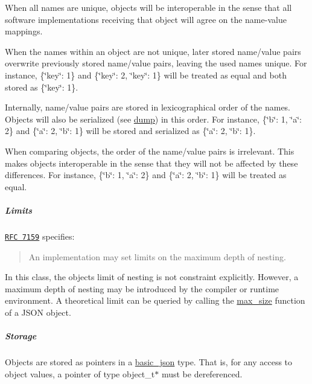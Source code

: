 \begin{DoxyItemize}
\item When all names are unique, objects will be interoperable in the sense that all software implementations receiving that object will agree on the name-\/value mappings.
\item When the names within an object are not unique, later stored name/value pairs overwrite previously stored name/value pairs, leaving the used names unique. For instance, {\ttfamily \{\char`\"{}key\char`\"{}\+: 1\}} and {\ttfamily \{\char`\"{}key\char`\"{}\+: 2, \char`\"{}key\char`\"{}\+: 1\}} will be treated as equal and both stored as {\ttfamily \{\char`\"{}key\char`\"{}\+: 1\}}.
\item Internally, name/value pairs are stored in lexicographical order of the names. Objects will also be serialized (see \hyperlink{classnlohmann_1_1basic__json_a805e3f3a2f374da0e14942eec7400e40}{dump}) in this order. For instance, {\ttfamily \{\char`\"{}b\char`\"{}\+: 1, \char`\"{}a\char`\"{}\+: 2\}} and {\ttfamily \{\char`\"{}a\char`\"{}\+: 2, \char`\"{}b\char`\"{}\+: 1\}} will be stored and serialized as {\ttfamily \{\char`\"{}a\char`\"{}\+: 2, \char`\"{}b\char`\"{}\+: 1\}}.
\item When comparing objects, the order of the name/value pairs is irrelevant. This makes objects interoperable in the sense that they will not be affected by these differences. For instance, {\ttfamily \{\char`\"{}b\char`\"{}\+: 1, \char`\"{}a\char`\"{}\+: 2\}} and {\ttfamily \{\char`\"{}a\char`\"{}\+: 2, \char`\"{}b\char`\"{}\+: 1\}} will be treated as equal.
\end{DoxyItemize}

\subparagraph*{Limits}

\href{http://rfc7159.net/rfc7159}{\tt R\+F\+C 7159} specifies\+: \begin{quote}
An implementation may set limits on the maximum depth of nesting. \end{quote}


In this class, the object\textquotesingle{}s limit of nesting is not constraint explicitly. However, a maximum depth of nesting may be introduced by the compiler or runtime environment. A theoretical limit can be queried by calling the \hyperlink{classnlohmann_1_1basic__json_ad5514a7435f246fc5335856465022a7a}{max\+\_\+size} function of a J\+S\+O\+N object.

\subparagraph*{Storage}

Objects are stored as pointers in a \hyperlink{classnlohmann_1_1basic__json}{basic\+\_\+json} type. That is, for any access to object values, a pointer of type {\ttfamily object\+\_\+t$\ast$} must be dereferenced.

